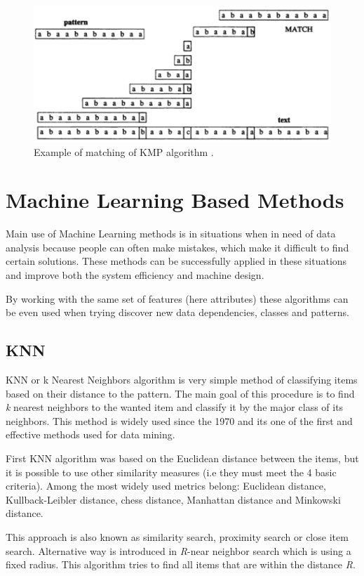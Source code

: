 \begin{figure}
\centering
\includegraphics[scale=0.4]{KMP}
\caption{Example of matching of KMP algorithm \cite{stringJewels}. }
\end{figure}

\section{Machine Learning Based Methods}\label{machineLearning}
Main use of Machine Learning methods is in situations when in need of data analysis because people can often make mistakes, which make it difficult to find certain solutions.
These methods can be successfully applied in these situations and improve both the system efficiency and machine design. 

By working with the same set of features (here attributes) these algorithms can be even used when trying discover new data dependencies, classes and patterns. \cite{mlbm}
\subsection{KNN}
KNN or k Nearest Neighbors algorithm is very simple method of classifying items based on their distance to the pattern. The main goal of this procedure is to find \textit{k} nearest neighbors to the wanted item and classify it by the major class of its neighbors. This method is widely used since the 1970 and its one of the first and effective methods used for data mining.

First KNN algorithm was based on the Euclidean distance between the items, but it is possible to use other similarity measures (i.e they must meet the 4 basic criteria). Among the most widely used metrics belong: Euclidean distance, Kullback-Leibler distance, chess distance, Manhattan distance and Minkowski distance.

This approach is also known as similarity search, proximity search or close item search. Alternative way is introduced in \textit{R}-near neighbor search which is using a fixed radius. This algorithm tries to find all items that are within the distance \textit{R}. \cite{hashing}

